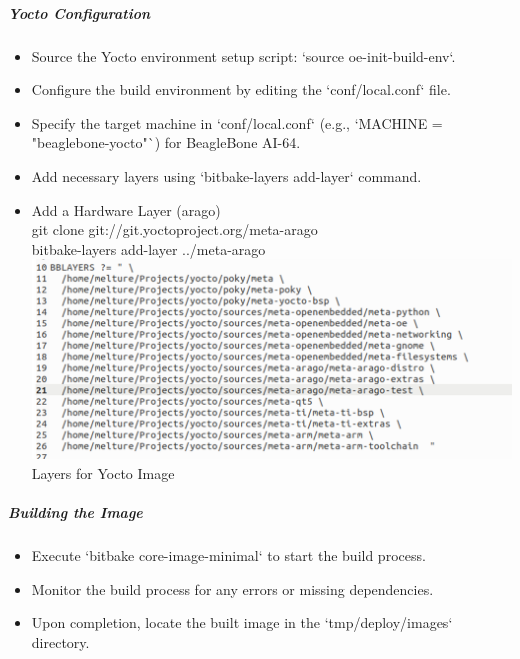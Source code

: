 \subparagraph{Yocto Configuration}
\begin{itemize}
    \item Source the Yocto environment setup script: `source oe-init-build-env`.
    
    \item Configure the build environment by editing the `conf/local.conf` file.
    
    \item Specify the target machine in `conf/local.conf` (e.g., `MACHINE = "beaglebone-yocto"`) for BeagleBone AI-64.
    
    \item Add necessary layers using `bitbake-layers add-layer` command.\\
    \item      Add a Hardware Layer (arago) \\
    git clone git://git.yoctoproject.org/meta-arago \\
    bitbake-layers add-layer ../meta-arago \\


        
        \includegraphics[width=1\linewidth]{Images/9_Linux_image/BBlayers.png}
\centering      
\\
Layers for Yocto Image
        \label{fig:enter-label}
\\


\end{itemize}
\raggedright
\subparagraph{Building the Image}
\begin{itemize}
    \item Execute `bitbake core-image-minimal` to start the build process.
    \item Monitor the build process for any errors or missing dependencies.
    \item Upon completion, locate the built image in the `tmp/deploy/images` directory.
\end{itemize}

